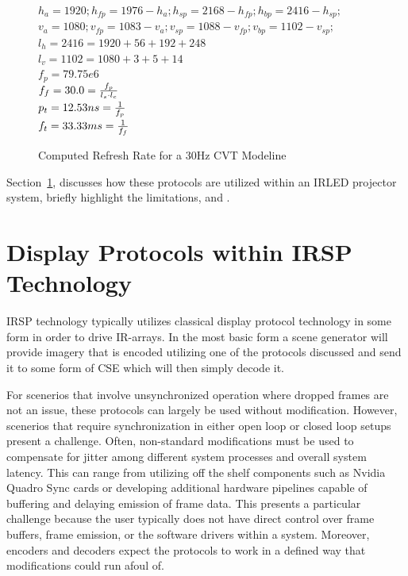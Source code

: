     \begin{figure}
        \centering
        { \Large
            $h_a=1920; h_{fp}=1976-h_a; h_{sp}=2168-h_{fp}; h_{bp}=2416-h_{sp};$ \\
            $v_a=1080; v_{fp}=1083-v_a; v_{sp}=1088-v_{fp}; v_{bp}=1102-v_{sp};$ \\
            $l_h=2416=1920+56+192+248$ \vspace{8px} \\
            $l_v=1102=1080+3+5+14$ \vspace{8px} \\
            $f_p=79.75e6$ \vspace{8px} \\
            $f_f=30.0={f_p \over {l_s \cdot l_c}}$ \\
            $p_t=12.53ns={1 \over f_p}$ \vspace{8px} \\
            $f_t=33.33ms={1 \over f_f}$ \vspace{8px}
        }
        \caption{Computed Refresh Rate for a 30Hz CVT Modeline}
        \label{fig:modeline_refresh_rate_plug}
    \end{figure}

    Section~\ref{sec:displays_within_proj_system}, discusses how these protocols are utilized within an IRLED projector system, briefly highlight the limitations, and . %

\section{Display Protocols within IRSP Technology}
    \label{sec:displays_within_proj_system}
    IRSP technology typically utilizes classical display protocol technology in some form in order to drive IR-arrays. In the most basic form a scene generator will provide imagery that is encoded utilizing one of the protocols discussed and send it to some form of CSE which will then simply decode it.

    For scenerios that involve unsynchronized operation where dropped frames are not an issue, these protocols can largely be used without modification. However, scenerios that require synchronization in either open loop or closed loop setups present a challenge. Often, non-standard modifications must be used to compensate for jitter among different system processes and overall system latency. This can range from utilizing off the shelf components such as Nvidia Quadro Sync cards\cite{NVIDIAQuadroSync} or developing additional hardware pipelines capable of buffering and delaying emission of frame data. This presents a particular challenge because the user typically does not have direct control over frame buffers, frame emission, or the software drivers within a system. Moreover, encoders and decoders expect the protocols to work in a defined way that modifications could run afoul of.
